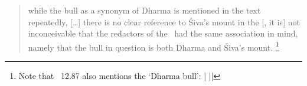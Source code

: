 \begin{quote} 
while the bull as a synonym of Dharma is mentioned in 
the text repeatedly, [\dots]
there is no clear reference to Śiva's mount in the [\VSS, it is] 
not inconceivable that the redactors of the \Vss\ had 
the same association in mind, namely that the bull in 
question is both Dharma and Śi­va's mount.%
	\footnote{Note that \SDhU\  12.87
				also mentions the `Dharma bull':
	     |
    	 || }
\end{quote} 



%



%
%

%

